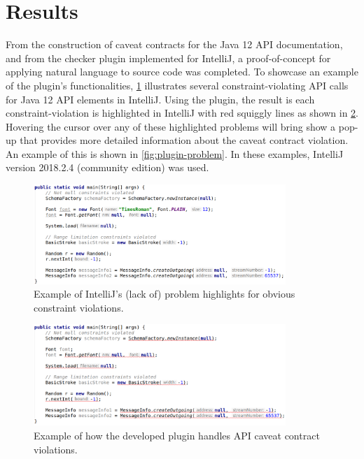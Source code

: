 \section{Results}
\label{sec:contract-results}
From the construction of caveat contracts for the Java 12 API documentation, and from the checker plugin implemented for IntelliJ, a proof-of-concept for applying natural language to source code was completed. To showcase an example of the plugin's functionalities, \ref{fig:plugin-inspection-off} illustrates several constraint-violating API calls for Java 12 API elements in IntelliJ. Using the plugin, the result is each constraint-violation is highlighted in IntelliJ with red squiggly lines as shown in \ref{fig:plugin-inspection-on}. Hovering the cursor over any of these highlighted problems will bring show a pop-up that provides more detailed information about the caveat contract violation. An example of this is shown in \ref{fig:plugin-problem}. In these examples, IntelliJ version 2018.2.4 (community edition) was used.

\begin{figure}
	\label{fig:plugin-inspection-off}
	\centering
	\includegraphics[width=0.85\textwidth]{figs/plugin-inspection-off.png}
	\caption{Example of IntelliJ's (lack of) problem highlights for obvious constraint violations.}
\end{figure}

\begin{figure}
	\label{fig:plugin-inspection-on}
	\centering
	\includegraphics[width=0.85\textwidth]{figs/plugin-inspection-on.png}
	\caption{Example of how the developed plugin handles API caveat contract violations.}
\end{figure}

